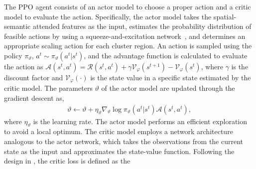 \documentclass[letterpaper]{article} %
\newcommand\blue[1]{\textcolor{blue}{#1}}
\newcommand\rjf[1]{\textcolor{red}{\{RJF: #1\}}}
\newcommand\qz[1]{\textcolor{blue}{\{QZ: #1\}}}
\begin{document}
The PPO agent consists of an actor model to choose a proper action and a critic model to evaluate the action. 
Specifically, the actor model takes the spatial-semantic attended features as the input, estimates the probability distribution of feasible actions by using a squeeze-and-excitation network~\cite{hu2018squeeze}, and determines an appropriate scaling action for each cluster region. An action is sampled using the policy $\pi_\vartheta$, $a^t \sim \pi_\vartheta (a^t | s^t)$, and the advantage function is calculated to evaluate the action as $\mathcal{A}(s^t, a^t)= \mathcal{R}(s^t, a^t)+%
\gamma \mathcal{V}_\varphi\left(s^{t+1}\right)-\mathcal{V}_\varphi\left(s^{t}\right)$, 
where $\gamma$ is the discount factor and %
$\mathcal{V}_\varphi(\cdot)$ is the state value %
in a specific state estimated by the critic model. %
The parameters $\vartheta$ of the actor model are updated through the gradient descent as,
\begin{align}
\label{eqn:actor_gradient}
\vartheta \leftarrow \vartheta+\eta_{\vartheta} \nabla_{\vartheta} \log \pi_\vartheta (a^t | s^t)\mathcal{A}(s^t, a^t),
\end{align}
where $\eta_{\vartheta}$ is the learning rate. %
The actor model %
performs an efficient exploration to avoid a local optimum. 
The critic model %
employs a network architecture analogous to the actor network, which takes the observations from the current state as the input and approximates the state-value function. Following the design in \cite{araslanov2019actor}, the critic loss is defined as the %
\end{document}

